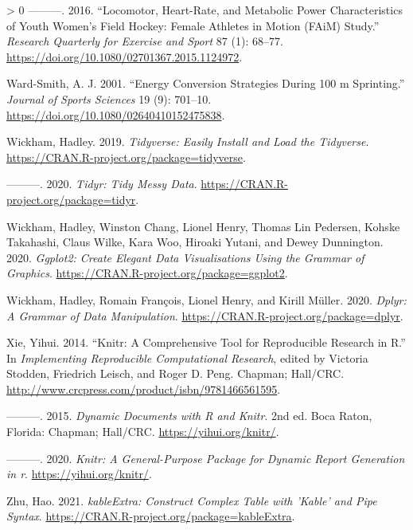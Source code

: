 \documentclass[fleqn,10pt,lineno]{wlpeerj} %
\newlength{\cslhangindent}
\newenvironment{CSLReferences}[3] %
 {%
  \setlength{\parindent}{0pt}
  \ifodd #1 \everypar{\setlength{\hangindent}{\cslhangindent}}\ignorespaces\fi
  \ifnum #2 > 0
  \setlength{\parskip}{#2\baselineskip}
  \fi
 }%
 {}
\begin{document}
\begin{CSLReferences}{1}{0}
\leavevmode\hypertarget{ref-vescoviLocomotorHeartRateMetabolic2016}{}%
---------. 2016. {``Locomotor, {Heart}-{Rate}, and {Metabolic Power Characteristics} of {Youth Women}'s {Field Hockey}: {Female Athletes} in {Motion} ({FAiM}) {Study}.''} \emph{Research Quarterly for Exercise and Sport} 87 (1): 68--77. \url{https://doi.org/10.1080/02701367.2015.1124972}.

\leavevmode\hypertarget{ref-ward-smithEnergyConversionStrategies2001}{}%
Ward-Smith, A. J. 2001. {``Energy Conversion Strategies During 100 m Sprinting.''} \emph{Journal of Sports Sciences} 19 (9): 701--10. \url{https://doi.org/10.1080/02640410152475838}.

\leavevmode\hypertarget{ref-R-tidyverse}{}%
Wickham, Hadley. 2019. \emph{Tidyverse: Easily Install and Load the Tidyverse}. \url{https://CRAN.R-project.org/package=tidyverse}.

\leavevmode\hypertarget{ref-R-tidyr}{}%
---------. 2020. \emph{Tidyr: Tidy Messy Data}. \url{https://CRAN.R-project.org/package=tidyr}.

\leavevmode\hypertarget{ref-R-ggplot2}{}%
Wickham, Hadley, Winston Chang, Lionel Henry, Thomas Lin Pedersen, Kohske Takahashi, Claus Wilke, Kara Woo, Hiroaki Yutani, and Dewey Dunnington. 2020. \emph{Ggplot2: Create Elegant Data Visualisations Using the Grammar of Graphics}. \url{https://CRAN.R-project.org/package=ggplot2}.

\leavevmode\hypertarget{ref-R-dplyr}{}%
Wickham, Hadley, Romain François, Lionel Henry, and Kirill Müller. 2020. \emph{Dplyr: A Grammar of Data Manipulation}. \url{https://CRAN.R-project.org/package=dplyr}.

\leavevmode\hypertarget{ref-knitr2014}{}%
Xie, Yihui. 2014. {``Knitr: A Comprehensive Tool for Reproducible Research in {R}.''} In \emph{Implementing Reproducible Computational Research}, edited by Victoria Stodden, Friedrich Leisch, and Roger D. Peng. Chapman; Hall/CRC. \url{http://www.crcpress.com/product/isbn/9781466561595}.

\leavevmode\hypertarget{ref-knitr2015}{}%
---------. 2015. \emph{Dynamic Documents with {R} and Knitr}. 2nd ed. Boca Raton, Florida: Chapman; Hall/CRC. \url{https://yihui.org/knitr/}.

\leavevmode\hypertarget{ref-R-knitr}{}%
---------. 2020. \emph{Knitr: A General-Purpose Package for Dynamic Report Generation in r}. \url{https://yihui.org/knitr/}.

\leavevmode\hypertarget{ref-R-kableExtra}{}%
Zhu, Hao. 2021. \emph{kableExtra: Construct Complex Table with 'Kable' and Pipe Syntax}. \url{https://CRAN.R-project.org/package=kableExtra}.

\end{CSLReferences}
\end{document}
